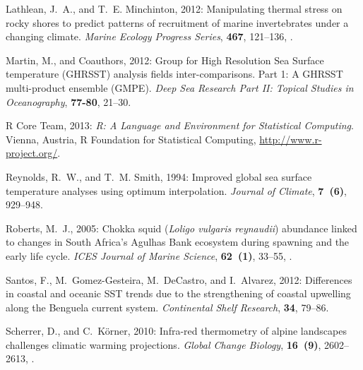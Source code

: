 \documentclass[]{ametsoc}
\begin{document}
\begin{thebibliography}{23}
Lathlean, J.~A., and T.~E. Minchinton, 2012: {Manipulating thermal stress on
  rocky shores to predict patterns of recruitment of marine invertebrates under
  a changing climate}. \textit{Marine Ecology Progress Series}, \textbf{467},
  121--136, .

Martin, M., and Coauthors, 2012: {Group for High Resolution Sea Surface
  temperature (GHRSST) analysis fields inter-comparisons. Part 1: A GHRSST
  multi-product ensemble (GMPE)}. \textit{Deep Sea Research Part II: Topical
  Studies in Oceanography}, \textbf{77-80}, 21--30.


{R Core Team}, 2013: \textit{{R: A Language and Environment for Statistical
  Computing}}. Vienna, Austria, R Foundation for Statistical Computing,
  \urlprefix\url{http://www.r-project.org/}.

Reynolds, R.~W., and T.~M. Smith, 1994: {Improved global sea surface
  temperature analyses using optimum interpolation}. \textit{Journal of
  Climate}, \textbf{7~(6)}, 929--948.

Roberts, M.~J., 2005: {Chokka squid (\textit{Loligo vulgaris reynaudii}) abundance
  linked to changes in South Africa's Agulhas Bank ecosystem during spawning
  and the early life cycle}. \textit{ICES Journal of Marine Science},
  \textbf{62~(1)}, 33--55, .

Santos, F., M.~Gomez-Gesteira, M.~DeCastro, and I.~Alvarez, 2012: {Differences
  in coastal and oceanic SST trends due to the strengthening of coastal
  upwelling along the Benguela current system}. \textit{Continental Shelf
  Research}, \textbf{34}, 79--86.

Scherrer, D., and C.~K{\"{o}}rner, 2010: {Infra-red thermometry of alpine
  landscapes challenges climatic warming projections}. \textit{Global Change
  Biology}, \textbf{16~(9)}, 2602--2613,
  .


\end{thebibliography}
\end{document}
